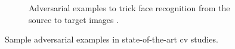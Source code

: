 \begin{figure}[p]
\begin{subfigure}[b]{0.8\linewidth}
    \caption{Adversarial examples to trick face recognition from the source to target images \citep{Wang:2018vl}.}
  \end{subfigure}

  \caption[Adversarial examples in computer vision]{Sample adversarial examples in state-of-the-art \gls{cv} studies.}
  \label{fig:background:software-quality:reliability-in-cv:adversarial-examples}
\end{figure}